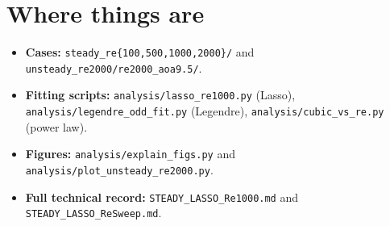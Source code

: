 \documentclass[11pt,a4paper]{article}
\begin{document}
\FloatBarrier
\clearpage
\section*{Where things are}

\begin{itemize}[leftmargin=*]
\item \textbf{Cases:} \texttt{steady\_re\{100,500,1000,2000\}/} and
  \texttt{unsteady\_re2000/re2000\_aoa9.5/}.
\item \textbf{Fitting scripts:} \texttt{analysis/lasso\_re1000.py} (Lasso),
  \texttt{analysis/legendre\_odd\_fit.py} (Legendre), \texttt{analysis/cubic\_vs\_re.py}
  (power law).
\item \textbf{Figures:} \texttt{analysis/explain\_figs.py} and
  \texttt{analysis/plot\_unsteady\_re2000.py}.
\item \textbf{Full technical record:} \texttt{STEADY\_LASSO\_Re1000.md} and
  \texttt{STEADY\_LASSO\_ReSweep.md}.
\end{itemize}
\end{document}
